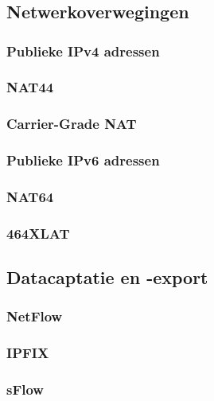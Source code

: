\chapter{}%
\label{ch:stand-van-zaken}



\section{Netwerkoverwegingen}
\subsection{Publieke IPv4 adressen}

\subsection{NAT44}

\subsection{Carrier-Grade NAT}

\subsection{Publieke IPv6 adressen}

\subsection{NAT64}

\subsection{464XLAT}

\section{Datacaptatie en -export}
\subsection{NetFlow}

\subsection{IPFIX}

\subsection{sFlow}

